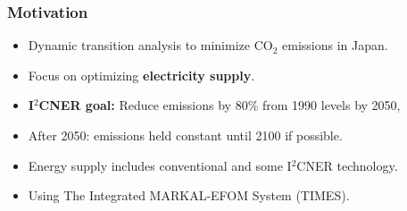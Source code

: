
\begin{frame}
  \frametitle{Motivation}
   \begin{itemize}
   
   \item Dynamic transition analysis to minimize CO$_2$ emissions in Japan.
   
   \item Focus on optimizing \textbf{electricity supply}.
   
   \item \textbf{I$^2$CNER goal:} Reduce emissions by 80\% from 1990 levels by 2050, 
   
   \item After 2050: emissions held constant until 2100 if possible.
   
   \item Energy supply includes conventional and some I$^2$CNER technology.
   
   \item Using The Integrated MARKAL-EFOM System (TIMES).
   \end{itemize}
%
        
\end{frame}
